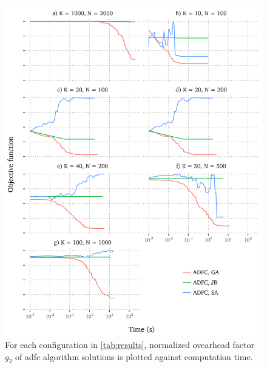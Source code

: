 \documentclass[12pt,journal,draftclsnofoot,onecolumn]{IEEEtran}
\begin{document}
\begin{figure}[htp]
	\includegraphics[]{figures/progress-adfc.png}
	\caption{For each configuration in \autoref{tab:results}, normalized ovearhead factor $g_2$ of \gls{adfc} algorithm solutions is plotted against computation time.}
	\label{fig:progress-adfc}
\end{figure}
\end{document}
